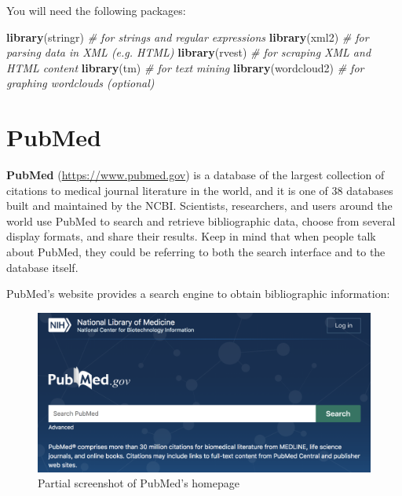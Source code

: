 \documentclass[
]{book}
\newenvironment{Shaded}{\begin{snugshade}}{\end{snugshade}}
\newcommand{\CommentTok}[1]{\textcolor[rgb]{0.56,0.35,0.01}{\textit{#1}}}
\newcommand{\FunctionTok}[1]{\textcolor[rgb]{0.13,0.29,0.53}{\textbf{#1}}}
\newcommand{\NormalTok}[1]{#1}
\begin{document}
You will need the following packages:

\begin{Shaded}
\begin{Highlighting}[]
\FunctionTok{library}\NormalTok{(stringr)    }\CommentTok{\# for strings and regular expressions}
\FunctionTok{library}\NormalTok{(xml2)       }\CommentTok{\# for parsing data in XML (e.g. HTML)}
\FunctionTok{library}\NormalTok{(rvest)      }\CommentTok{\# for scraping XML and HTML content}
\FunctionTok{library}\NormalTok{(tm)         }\CommentTok{\# for text mining}
\FunctionTok{library}\NormalTok{(wordcloud2) }\CommentTok{\# for graphing wordclouds (optional)}
\end{Highlighting}
\end{Shaded}

\hypertarget{pubmed}{%
\section{PubMed}\label{pubmed}}

\textbf{PubMed} (\url{https://www.pubmed.gov}) is a database of the largest collection of
citations to medical journal literature in the world, and it is one of 38
databases built and maintained by the NCBI. Scientists, researchers, and users
around the world use PubMed to search and retrieve bibliographic data, choose
from several display formats, and share their results. Keep in mind that when
people talk about PubMed, they could be referring to both the search interface
and to the database itself.

PubMed's website provides a search engine to obtain bibliographic information:

\begin{figure}

{\centering \includegraphics[width=0.7\linewidth]{images/api/pubmed-homepage} 

}

\caption{Partial screenshot of PubMed's homepage}\label{fig:unnamed-chunk-143}
\end{figure}
\end{document}

